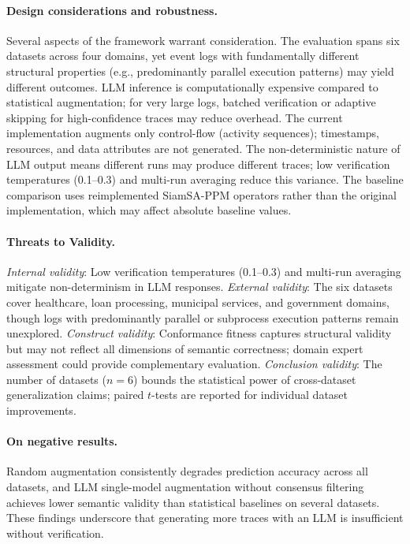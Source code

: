 \documentclass[11pt,a4paper]{article}
\begin{document}
\paragraph{Design considerations and robustness.} Several aspects of the framework warrant consideration. The evaluation spans six datasets across four domains, yet event logs with fundamentally different structural properties (e.g., predominantly parallel execution patterns) may yield different outcomes. LLM inference is computationally expensive compared to statistical augmentation; for very large logs, batched verification or adaptive skipping for high-confidence traces may reduce overhead. The current implementation augments only control-flow (activity sequences); timestamps, resources, and data attributes are not generated. The non-deterministic nature of LLM output means different runs may produce different traces; low verification temperatures (0.1--0.3) and multi-run averaging reduce this variance. The baseline comparison uses reimplemented SiamSA-PPM operators rather than the original implementation, which may affect absolute baseline values.

\paragraph{Threats to Validity.} \emph{Internal validity}: Low verification temperatures (0.1--0.3) and multi-run averaging mitigate non-determinism in LLM responses. \emph{External validity}: The six datasets cover healthcare, loan processing, municipal services, and government domains, though logs with predominantly parallel or subprocess execution patterns remain unexplored. \emph{Construct validity}: Conformance fitness captures structural validity but may not reflect all dimensions of semantic correctness; domain expert assessment could provide complementary evaluation. \emph{Conclusion validity}: The number of datasets ($n = 6$) bounds the statistical power of cross-dataset generalization claims; paired $t$-tests are reported for individual dataset improvements.

\paragraph{On negative results.} Random augmentation consistently degrades prediction accuracy across all datasets, and LLM single-model augmentation without consensus filtering achieves lower semantic validity than statistical baselines on several datasets. These findings underscore that generating more traces with an LLM is insufficient without verification.
\end{document}
